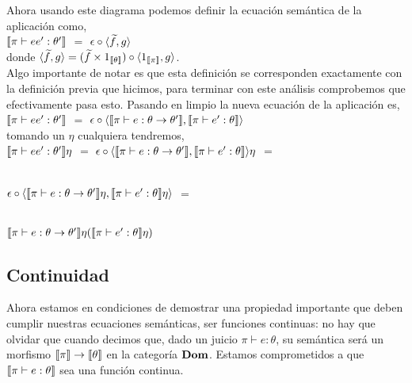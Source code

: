 Ahora usando este diagrama podemos definir la ecuaci\'on sem\'antica
de la aplicaci\'on como,\\

$\llbracket \pi \vdash ee' : \theta' \rrbracket$ $=$ $\epsilon \circ \langle \widetilde{f},g \rangle$\\

donde $\langle \widetilde{f},g \rangle = (\widetilde{f} \times 1_{\llbracket \theta \rrbracket}) \circ \langle 1_{\llbracket \pi \rrbracket} , g \rangle$.\\

Algo importante de notar es que esta definici\'on se corresponden exactamente
con la definici\'on previa que hicimos, para terminar con este an\'alisis 
comprobemos que efectivamente pasa esto. Pasando en limpio la nueva ecuaci\'on
de la aplicaci\'on es,\\

$\llbracket \pi \vdash ee' : \theta' \rrbracket$ $=$ 
$\epsilon \circ \langle \llbracket \pi \vdash e : \theta \rightarrow \theta' \rrbracket
									,\llbracket \pi \vdash e' : \theta \rrbracket \rangle$\\

\noindent									
tomando un $\eta$ cualquiera tendremos,\\

$\llbracket \pi \vdash ee' : \theta' \rrbracket\eta$ $=$ 
$\epsilon \circ \langle \llbracket \pi \vdash e : \theta \rightarrow \theta' \rrbracket
									,\llbracket \pi \vdash e' : \theta \rrbracket \rangle \eta$ $=$\\
\

$\epsilon \circ \langle \llbracket \pi \vdash e : \theta \rightarrow \theta' \rrbracket\eta
									,\llbracket \pi \vdash e' : \theta \rrbracket\eta \rangle$ $=$\\
\

$\llbracket \pi \vdash e : \theta \rightarrow \theta' \rrbracket\eta
									(\llbracket \pi \vdash e' : \theta \rrbracket \eta)$

\subsection{Continuidad}

Ahora estamos en condiciones de demostrar una propiedad importante que deben cumplir nuestras 
ecuaciones sem\'anticas, ser funciones continuas: no hay que olvidar
que cuando decimos que, dado un juicio $\pi \vdash e : \theta$, su sem\'antica ser\'a
un morfismo $\llbracket \pi \rrbracket \rightarrow \llbracket \theta \rrbracket$ en la categor\'ia $\textbf{Dom}$.
Estamos comprometidos a que $\llbracket \pi \vdash e : \theta \rrbracket$ sea una funci\'on
continua.\\

